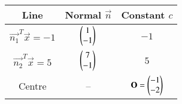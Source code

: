 \begin{tabular}{|c|c|c|}
\hline
Line & Normal $\vec{n}$ & Constant $c$ \\
\hline
$\vec{n_1}^T\vec{x}=-1$ & $\begin{pmatrix}1\\-1\end{pmatrix}$ & $-1$ \\
\hline
$\vec{n_2}^T\vec{x}=5$  & $\begin{pmatrix}7\\-1\end{pmatrix}$ & $5$ \\
\hline
Centre & -- & $\mathbf{O}=\begin{pmatrix}-1\\-2\end{pmatrix}$ \\
\hline
\end{tabular}

